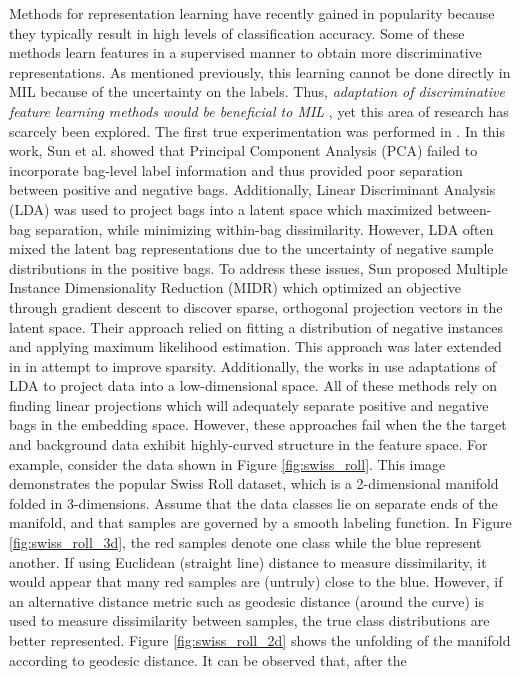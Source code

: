 Methods for representation learning have recently gained in popularity because they typically result in high levels of classification accuracy.  Some of these methods  learn features in a supervised manner to obtain more discriminative representations.  As mentioned previously, this learning cannot be done directly in  MIL because of the uncertainty on the labels.  Thus, \textit{adaptation of discriminative  feature learning methods would be beneficial to MIL} \citep{Carbonneau2016MILSurvey}, yet this area of research has scarcely been explored.  The first true experimentation was performed in \citep{Sun2010MIDR}.  In this work, Sun et al. showed that Principal Component Analysis (PCA) failed to incorporate bag-level label information and thus provided poor separation between positive and negative bags.  Additionally, Linear Discriminant Analysis (LDA) was used to project bags into a latent space which maximized between-bag separation, while minimizing within-bag dissimilarity.  However, LDA often mixed the latent bag representations due to the uncertainty of negative sample distributions in the positive bags.  To address these issues, Sun proposed Multiple Instance Dimensionality Reduction (MIDR) which optimized an objective through gradient descent to discover sparse, orthogonal projection vectors in the latent space.  Their approach relied on fitting a distribution of negative instances and applying maximum likelihood estimation.  This approach was later extended in \citep{Zhu2018MIDRSparsity} in attempt to improve sparsity.  Additionally, the works in \citep{Ping2010MILDRMaxMargin,Kim2010LocalDRMIL,Chai2014MIDA} use adaptations of LDA to project data into a low-dimensional space. All of these methods rely on finding linear projections which will adequately separate positive and negative bags in the embedding space.  However, these approaches fail when the the target and background data exhibit highly-curved structure in the feature space.  For example, consider the data shown in Figure \ref{fig:swiss_roll}.  This image demonstrates the popular Swiss Roll dataset, which is a 2-dimensional manifold folded in 3-dimensions.  Assume that the data classes lie on separate ends of the manifold, and that samples are governed by a smooth labeling function.  In Figure \ref{fig:swiss_roll_3d}, the red samples denote one class while the blue represent another.  If using Euclidean (straight line) distance to measure dissimilarity, it would appear that many red samples are (untruly) close to the blue.  However, if an alternative distance metric such as geodesic distance (around the curve) is used to measure dissimilarity between samples, the true class distributions are better represented.  Figure \ref{fig:swiss_roll_2d} shows the unfolding of the manifold according to geodesic distance.  It can be observed that, after the 